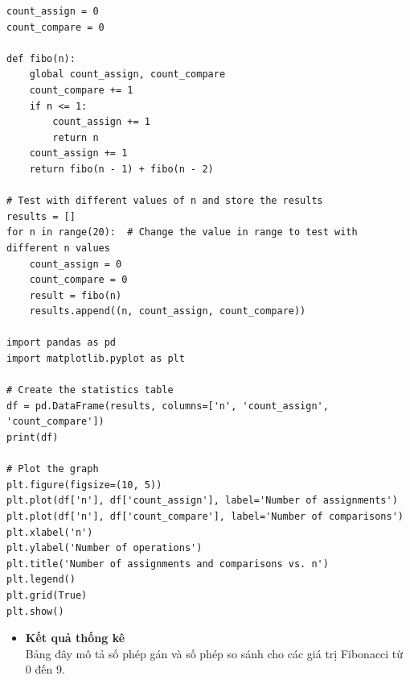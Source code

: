 \documentclass[12pt,a4paper]{article}
\begin{document}
\begin{enumerate}[label=\textbf{Câu 2:} ]
\begin{enumerate}[label=\textbf{Câu 3:} ]
\begin{enumerate}[label=\alph*)]
                              \begin{lstlisting}
count_assign = 0
count_compare = 0

def fibo(n):
    global count_assign, count_compare
    count_compare += 1
    if n <= 1:
        count_assign += 1
        return n
    count_assign += 1
    return fibo(n - 1) + fibo(n - 2)

# Test with different values of n and store the results
results = []
for n in range(20):  # Change the value in range to test with different n values
    count_assign = 0
    count_compare = 0
    result = fibo(n)
    results.append((n, count_assign, count_compare))

import pandas as pd
import matplotlib.pyplot as plt

# Create the statistics table
df = pd.DataFrame(results, columns=['n', 'count_assign', 'count_compare'])
print(df)

# Plot the graph
plt.figure(figsize=(10, 5))
plt.plot(df['n'], df['count_assign'], label='Number of assignments')
plt.plot(df['n'], df['count_compare'], label='Number of comparisons')
plt.xlabel('n')
plt.ylabel('Number of operations')
plt.title('Number of assignments and comparisons vs. n')
plt.legend()
plt.grid(True)
plt.show()

\end{lstlisting}
\begin{itemize}
    \item \textbf{Kết quả thống kê}\\
    Bảng đây mô tả số phép gán và số phép so sánh cho các giá trị Fibonacci từ 0 đến 9.


\end{itemize}
\end{enumerate}
\end{enumerate}
\end{enumerate}
\end{document}
